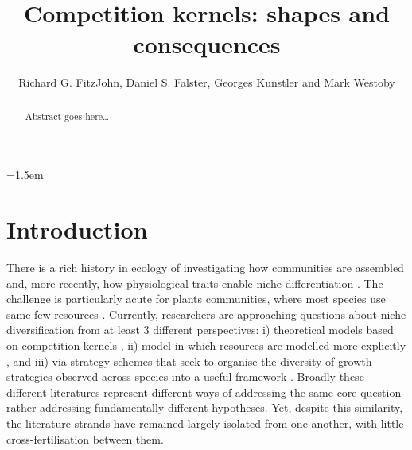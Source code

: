 \documentclass[a4paper,11pt]{article}
\title{Competition kernels: shapes and consequences}
\author{Richard G. FitzJohn, Daniel S. Falster, Georges Kunstler and Mark Westoby}
\date{}
\affiliation{Department of Biological Sciences, Macquarie University,
  Sydney, Australia}
\begin{document}

\mstitlepage
\parindent=1.5em
\addtolength{\parskip}{.3em}

\begin{abstract}
Abstract goes here\ldots
\end{abstract}

\section{Introduction}

There is a rich history in ecology of investigating how communities are assembled
and, more recently, how physiological traits enable niche differentiation
\cite[e.g.][]{Gause-1934,MacArthur-1967,Leimar-2013}.
%
The challenge is particularly acute for plants communities,
where most species use same few resources \citep{Whittaker-1970,Grime-1979,
Hubbell-2001, Westoby-2002}.
%
Currently, researchers are approaching questions about niche diversification
from at least 3 different perspectives: 
i) theoretical models based on competition kernels 
\cite[e.g.][]{MacArthur-1967,Case-1982,Dieckmann-1999,Leimar-2013},
ii) model in which resources are modelled more explicitly 
\citep[e.g.][]{Tilman-1977,Huston-1987, Kohyama-1993, Falster-2011},
and  iii) via strategy schemes that seek to organise the diversity of
growth strategies observed across species into a useful framework 
\citep[e.g.][]{Grime-1979,Weiher-1999,Westoby-2002}. 
Broadly these different literatures represent different ways of addressing 
the same core question rather addressing fundamentally different hypotheses. 
Yet, despite this similarity, the literature strands have remained largely isolated
from one-another, with little cross-fertilisation between them. 
\end{document}
